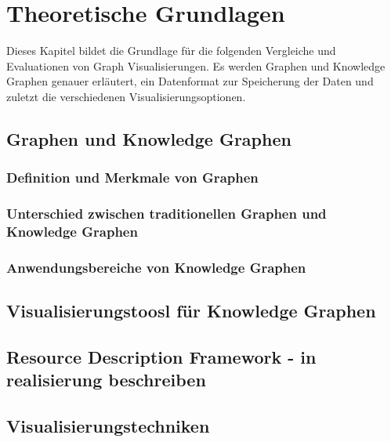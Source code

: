 
\chapter{Theoretische Grundlagen}

Dieses Kapitel bildet die Grundlage für die folgenden Vergleiche und Evaluationen von Graph Visualisierungen. Es werden Graphen und Knowledge Graphen genauer erläutert, ein Datenformat zur Speicherung der Daten und zuletzt die verschiedenen Visualisierungsoptionen. 


\section{Graphen und Knowledge Graphen}

\subsection{Definition und Merkmale von Graphen}
\subsection{Unterschied zwischen traditionellen Graphen und Knowledge Graphen}
\subsection{Anwendungsbereiche von Knowledge Graphen}

\section{Visualisierungstoosl für Knowledge Graphen}

\section{Resource Description Framework - in realisierung beschreiben}

\section{Visualisierungstechniken}

